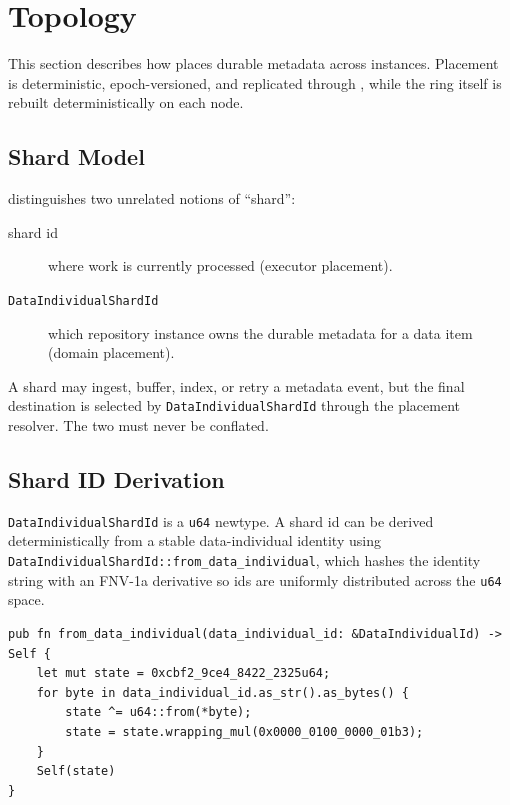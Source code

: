 \section{Topology}
\label{sec:topology}

This section describes how \vannak{} places durable metadata across \ipto{}
instances. Placement is deterministic, epoch-versioned, and replicated through
\raft{}, while the ring itself is rebuilt deterministically on each node.

\subsection{Shard Model}

\vannak{} distinguishes two unrelated notions of ``shard'':

\begin{description}
\item[\sitas{} shard id] where work is currently processed (executor placement).
\item[\texttt{DataIndividualShardId}] which \ipto{} repository instance owns the
  durable metadata for a data item (domain placement).
\end{description}

A \sitas{} shard may ingest, buffer, index, or retry a metadata event, but the
final \ipto{} destination is selected by \texttt{DataIndividualShardId} through
the placement resolver. The two must never be conflated.

\subsection{Shard ID Derivation}

\texttt{DataIndividualShardId} is a \texttt{u64} newtype. A shard id can be
derived deterministically from a stable data-individual identity using
\texttt{DataIndividualShardId::from\_data\_individual}, which hashes the
identity string with an FNV-1a derivative so ids are uniformly distributed
across the \texttt{u64} space.

\begin{lstlisting}
pub fn from_data_individual(data_individual_id: &DataIndividualId) -> Self {
    let mut state = 0xcbf2_9ce4_8422_2325u64;
    for byte in data_individual_id.as_str().as_bytes() {
        state ^= u64::from(*byte);
        state = state.wrapping_mul(0x0000_0100_0000_01b3);
    }
    Self(state)
}
\end{lstlisting}

